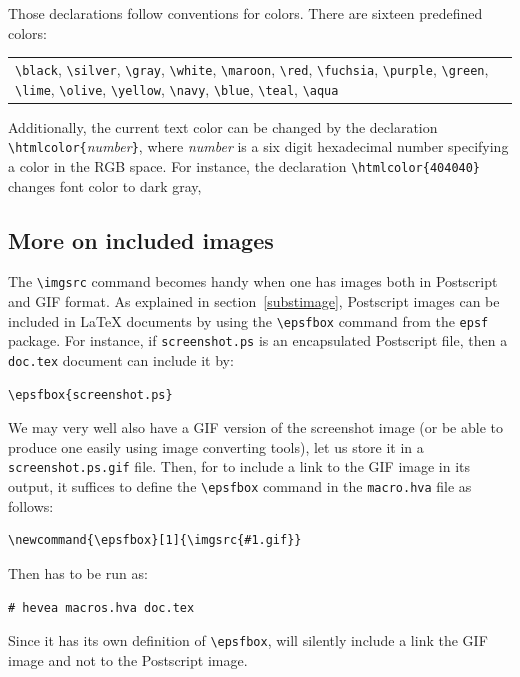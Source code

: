 Those declarations follow \html{} conventions for colors.
There are sixteen predefined colors:
\begin{center}
\begin{tabular}{p{.7\linewidth}}
\verb+\black+,
\verb+\silver+,
\verb+\gray+,
\verb+\white+,
\verb+\maroon+,
\verb+\red+,
\verb+\fuchsia+,
\verb+\purple+,
\verb+\green+,
\verb+\lime+,
\verb+\olive+,
\verb+\yellow+,
\verb+\navy+,
\verb+\blue+,
\verb+\teal+,
\verb+\aqua+
\end{tabular}
\end{center}
Additionally, the current text color can be
changed by the declaration \verb+\htmlcolor{+{\it number}\verb+}+,
where {\it number} is a six digit hexadecimal number specifying a
color in the RGB space.  For instance, the declaration
\verb+\htmlcolor{404040}+
changes font color to dark gray,

\subsection{More on included images}\label{imgsrc}
The \verb+\imgsrc+ command
becomes handy when one has images both in Postscript and GIF format.
As explained in section~\ref{substimage}, Postscript images can
be included in \LaTeX{} documents by using the \verb+\epsfbox+
command from the \texttt{epsf} package.
For instance, if \texttt{screenshot.ps} is an encapsulated  Postscript
file, then a \texttt{doc.tex} document can include it by:
\begin{verbatim}
\epsfbox{screenshot.ps}
\end{verbatim}
We may very well also have a GIF version of the screenshot image
(or be able to produce one easily using image converting tools),
let us store it in a \texttt{screenshot.ps.gif} file.
Then, for \hevea{} to include a link to the GIF image in its
output, it suffices
to define the \verb+\epsfbox+ command in the \texttt{macro.hva} file
as follows:
\begin{verbatim}
\newcommand{\epsfbox}[1]{\imgsrc{#1.gif}}
\end{verbatim}
Then \hevea{} has to be run as:
\begin{verbatim}
# hevea macros.hva doc.tex
\end{verbatim}
Since it has its own definition of \verb+\epsfbox+, \hevea{} will
silently include a link the GIF image and not to the Postscript image.

